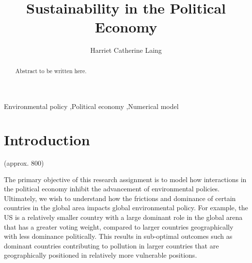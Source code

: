 \documentclass[11pt,preprint, authoryear]{elsarticle}
\numberwithin{equation}{section}
\numberwithin{figure}{section}
\numberwithin{table}{section}
\begin{document}
\begin{frontmatter}  %

\title{Sustainability in the Political Economy}





\author[Add1]{Harriet Catherine Laing}





\address[Add1]{University of Stellenbosch, South Africa}


\begin{abstract}
\small{
Abstract to be written here.
}
\end{abstract}

\vspace{1cm}


\begin{keyword}
\footnotesize{
Environmental policy \sep Political economy \sep Numerical model \\
\vspace{0.3cm}
}
\end{keyword}



\vspace{0.5cm}

\end{frontmatter}



\pagestyle{fancy}
\chead{}
\rhead{}
\lfoot{}
\lhead{}
\cfoot{}


\headsep 35pt %




\hypertarget{introduction}{%
\section{\texorpdfstring{Introduction
\label{Introduction}}{Introduction }}\label{introduction}}

(approx. 800)

The primary objective of this research assignment is to model how
interactions in the political economy inhibit the advancement of
environmental policies. Ultimately, we wish to understand how the
frictions and dominance of certain countries in the global area impacts
global environmental policy. For example, the US is a relatively smaller
country with a large dominant role in the global arena that has a
greater voting weight, compared to larger countries geographically with
less dominance politically. This results in sub-optimal outcomes such as
dominant countries contributing to pollution in larger countries that
are geographically positioned in relatively more vulnerable positions.
\end{document}
